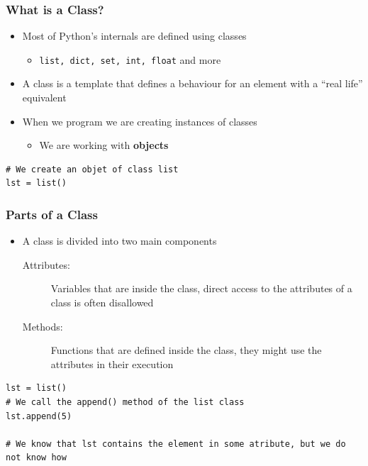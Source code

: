 \documentclass[11pt]{beamer}
\begin{document}
\begin{frame}[fragile]\frametitle{What is a Class?}
\begin{itemize}
\item Most of Python's internals are defined using classes
    \begin{itemize}
    \item \lstinline|list, dict, set, int, float| and more
    \end{itemize}
\item A class is a template that defines a behaviour for an element with a ``real life'' equivalent
\item When we program we are creating instances of classes
    \begin{itemize}
    \item We are working with \textbf{objects}
    \end{itemize}
\end{itemize}
\begin{lstlisting}
# We create an objet of class list
lst = list()
\end{lstlisting}
\end{frame}

\begin{frame}[fragile]\frametitle{Parts of a Class}
\begin{itemize}
\item A class is divided into two main components
\begin{description}
\item[Attributes:] Variables that are inside the class, direct access to the attributes of a class is often disallowed
\item[Methods:] Functions that are defined inside the class, they might use the attributes in their execution
\end{description}
\end{itemize}
\begin{lstlisting}
lst = list()
# We call the append() method of the list class
lst.append(5)

# We know that lst contains the element in some atribute, but we do not know how
\end{lstlisting}
\end{frame}
\end{document}
